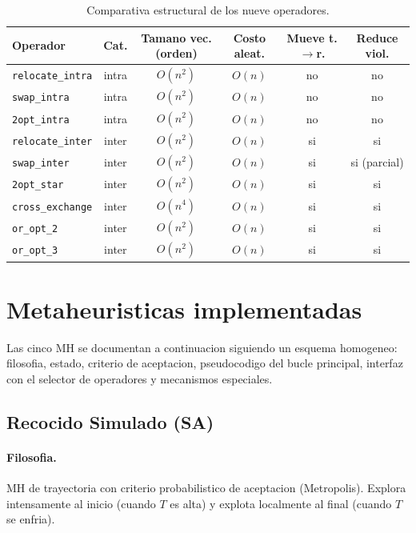 \documentclass[11pt,a4paper]{article}
\newcommand{\mh}{MH}
\newcommand{\op}[1]{\texttt{#1}}
\begin{document}
\begin{table}[h]
\centering
\caption{Comparativa estructural de los nueve operadores.}\label{tab:operadores}
\small
\begin{tabular}{lccccc}
\toprule
Operador & Cat. & Tamano vec. (orden) & Costo aleat. & Mueve t.$\to$r. & Reduce viol. \\
\midrule
\op{relocate\_intra}   & intra & $O(n^2)$ & $O(n)$ & no & no \\
\op{swap\_intra}       & intra & $O(n^2)$ & $O(n)$ & no & no \\
\op{2opt\_intra}       & intra & $O(n^2)$ & $O(n)$ & no & no \\
\op{relocate\_inter}   & inter & $O(n^2)$ & $O(n)$ & si & si \\
\op{swap\_inter}       & inter & $O(n^2)$ & $O(n)$ & si & si (parcial) \\
\op{2opt\_star}        & inter & $O(n^2)$ & $O(n)$ & si & si \\
\op{cross\_exchange}   & inter & $O(n^4)$ & $O(n)$ & si & si \\
\op{or\_opt\_2}        & inter & $O(n^2)$ & $O(n)$ & si & si \\
\op{or\_opt\_3}        & inter & $O(n^2)$ & $O(n)$ & si & si \\
\bottomrule
\end{tabular}
\end{table}

\section{Metaheuristicas implementadas}\label{sec:metaheuristicas}

Las cinco \mh{} se documentan a continuacion siguiendo un esquema
homogeneo: filosofia, estado, criterio de aceptacion, pseudocodigo del
bucle principal, interfaz con el selector de operadores y mecanismos
especiales.

\subsection{Recocido Simulado (SA)}\label{sec:sa}

\paragraph{Filosofia.} \mh{} de trayectoria con criterio
probabilistico de aceptacion (Metropolis). Explora intensamente al
inicio (cuando $T$ es alta) y explota localmente al final (cuando $T$
se enfria).
\end{document}
